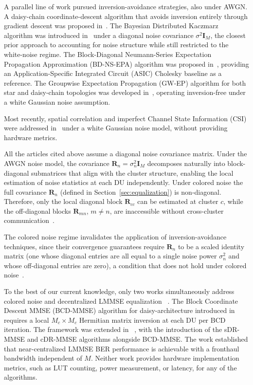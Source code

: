 \documentclass[12pt]{article}
\begin{document}
A parallel line of work pursued inversion-avoidance strategies, also under AWGN.
A daisy-chain coordinate-descent algorithm that avoids inversion entirely through
gradient descent was proposed in~\cite{rodriguezsanchez2020}. The Bayesian
Distributed Kaczmarz algorithm was introduced in~\cite{croisfelt2021} under a
diagonal noise covariance $\sigma^2\mathbf{I}_M$, the closest prior approach to
accounting for noise structure while still restricted to the white-noise regime.
The Block-Diagonal Neumann-Series Expectation Propagation Approximation
(BD-NS-EPA) algorithm was proposed in~\cite{wang2023bdnsepa}, providing an
Application-Specific Integrated Circuit (ASIC) Cholesky baseline as a reference.
The Groupwise Expectation Propagation (GW-EP) algorithm for both star and
daisy-chain topologies was developed in~\cite{li2023iotj}, operating
inversion-free under a white Gaussian noise assumption.

Most recently, spatial correlation and imperfect Channel State Information (CSI) were addressed in~\cite{zhuang2025} under a white Gaussian noise model, without providing hardware metrics.

All the articles cited above assume a diagonal noise covariance matrix. Under the AWGN noise model, the covariance  $\mathbf{R}_n = \sigma_n^2\mathbf{I}_M$ decomposes
naturally into block-diagonal submatrices that align with the cluster structure,
enabling the local estimation of noise statistics at each DU independently.
Under colored noise the full covariance $\mathbf{R}_n$ (defined in
Section~\ref{sec:equalization}) is non-diagonal. Therefore, only the local diagonal block
$\mathbf{R}_{cc}$ can be estimated at cluster $c$, while the off-diagonal blocks
$\mathbf{R}_{mn}$, $m \neq n$, are inaccessible without cross-cluster
communication~\cite{zhao2025jsac}.

The colored noise regime invalidates the application of inversion-avoidance
techniques, since their convergence guarantees require $\mathbf{R}_n$ to be
a scaled identity matrix (one whose diagonal entries are all equal to
a single noise power $\sigma_n^2$ and whose off-diagonal entries are zero),
a condition that does not hold under colored noise~\cite{wang2023bdnsepa}.


To the best of our
current knowledge, only two works simultaneously address colored noise and
decentralized LMMSE equalization ~\cite{zhao2021globecom,zhao2025jsac}. The Block Coordinate Descent MMSE (BCD-MMSE) algorithm for daisy-architecture introduced in ~\cite{zhao2021globecom} requires a local $M_c \times M_c$ Hermitian matrix inversion
at each DU per BCD iteration. The framework was extended in ~\cite{zhao2025jsac}, with the introduction of the sDR-MMSE and cDR-MMSE algorithms alongside BCD-MMSE. The work established that near-centralized LMMSE BER performance is achievable with a fronthaul bandwidth independent of $M$. Neither work provides hardware implementation metrics,  such as LUT counting, power measurement, or latency, for any of the algorithms. 
\end{document}
